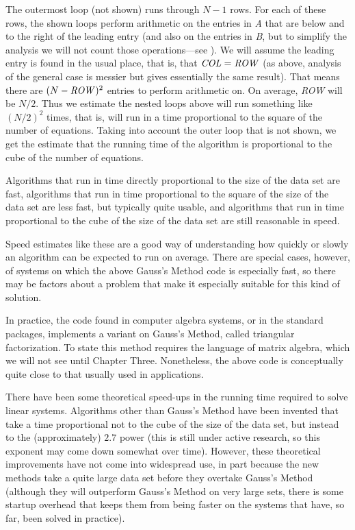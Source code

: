 The outermost loop (not shown) runs through $N-1$ rows.
For each of these rows, 
the shown loops perform arithmetic on the entries
in \textit{A} that are below and to the right of the leading entry
(and also on the entries in \textit{B}, but to simplify the
analysis we will not count those operations---see \nearbyexercise{}).
We will assume the leading entry is found in the usual place, that is, that 
$\text{\textit{COL}}=\text{\textit{ROW}}$
(as above, analysis of the general case is messier but gives essentially
the same result).
That means there are $(N-\text{\textit{ROW}})^2$ entries to perform
arithmetic on.
On average, \textit{ROW} will be $N/2$.
Thus we estimate the nested loops above will run 
something like $(N/2)^2$ times,
that is, will run in a time proportional to the square of the number
of equations.
Taking into account the outer loop that is not shown, we get
the estimate that the running time of the algorithm
is proportional to the cube of the number of equations.

Algorithms that run in time directly proportional to the size of the 
data set are fast, algorithms that run in time proportional to the
square of the size of the data set are less fast, but typically quite
usable, and algorithms that run in time proportional to the cube of
the size of the data set are still reasonable in speed. 

Speed estimates like these are a good way of understanding how quickly or
slowly an algorithm can be expected to run on average.
There are special cases, however, of systems on which the above 
Gauss's Method code is especially fast, so there may be factors
about a problem that make it especially suitable for this kind of solution.

In practice, the code found in computer algebra systems, or in the
standard packages, implements a variant on Gauss's Method, called 
triangular factorization.
To state this method requires the language of matrix algebra, which we will not
see until Chapter Three.
Nonetheless, the above code is conceptually quite close to that usually used
in applications.

There have been some theoretical speed-ups in the running time required
to solve linear systems.
Algorithms other than Gauss's Method have been invented
that take a time proportional not to the cube of the size of the
data set, but instead to the (approximately) $2.7$ power
(this is still under active research, so this exponent may
come down somewhat over time).
However, these theoretical improvements have not come into widespread
use,
in part because the new methods take a quite large data set before
they overtake Gauss's Method 
(although they will outperform Gauss's Method on very large sets, there
is some startup overhead that keeps them from being faster on the
systems that have, so far, been solved in practice).   



